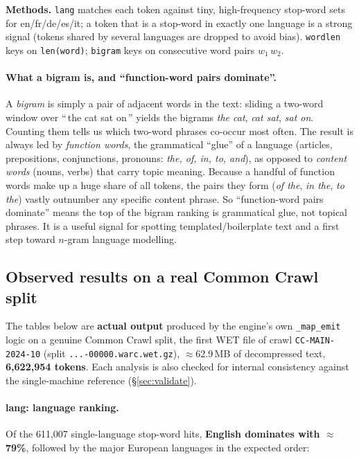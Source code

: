 \documentclass[11pt,a4paper]{article}
\newcommand{\code}[1]{\texttt{\small #1}}
\begin{document}
\noindent\textbf{Methods.} \code{lang} matches each token against tiny,
high-frequency stop-word sets for en/fr/de/es/it; a token that is a stop-word in
exactly one language is a strong signal (tokens shared by several languages are
dropped to avoid bias). \code{wordlen} keys on \code{len(word)}; \code{bigram}
keys on consecutive word pairs $w_1\,w_2$.

\paragraph{What a bigram is, and ``function-word pairs dominate''.} A
\emph{bigram} is simply a pair of adjacent words in the text: sliding a
two-word window over ``\,the cat sat on\,'' yields the bigrams
\emph{the cat}, \emph{cat sat}, \emph{sat on}. Counting them tells us which
two-word phrases co-occur most often. The result is always led by
\emph{function words}, the grammatical ``glue'' of a language (articles,
prepositions, conjunctions, pronouns: \emph{the, of, in, to, and}), as opposed
to \emph{content words} (nouns, verbs) that carry topic meaning. Because a
handful of function words make up a huge share of all tokens, the pairs they
form (\emph{of the}, \emph{in the}, \emph{to the}) vastly outnumber any specific
content phrase. So ``function-word pairs dominate'' means the top of the bigram
ranking is grammatical glue, not topical phrases. It is a useful signal for spotting
templated/boilerplate text and a first step toward $n$-gram language modelling.

\subsection{Observed results on a real Common Crawl split}\label{sec:jobresults}

The tables below are \textbf{actual output} produced by the engine's own
\code{\_map\_emit} logic on a genuine Common Crawl split, the first WET file of
crawl \code{CC-MAIN-2024-10} (split
\code{...-00000.warc.wet.gz}), $\approx$62.9\,MB of
decompressed text, \textbf{6{,}622{,}954 tokens}. Each analysis is also checked
for internal consistency against the single-machine reference
(\S\ref{sec:validate}).

\paragraph{lang: language ranking.} Of the 611{,}007 single-language stop-word
hits, \textbf{English dominates with $\approx$79\%}, followed by the major
European languages in the expected order:
\end{document}
